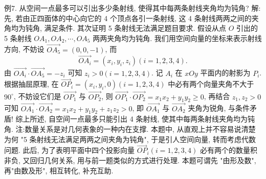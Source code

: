 例7. 从空间一点最多可以引出多少条射线, 使得其中每两条射线夹角均为钝角?
解:先, 若由正四面体的中心向它的 4 个顶点各引一条射线, 这 4 条射线两两之间的夹角均为钝角, 满足条件.
其次证明 5 条射线无法满足题目要求.
假设从点 $O$ 引出的 5 条射线 $O A_1, O A_2, \cdots, O A_5$ 两两夹角均为钝角.
我们用空间向量的坐标来表示射线方向, 不妨设 $\overrightarrow{O A_5}=(0,0,-1)$, 而
$$
\overrightarrow{O A_i}=\left(x_i, y_i, z_i\right)(i=1,2,3,4) .
$$
由 $\overrightarrow{O A_i} \cdot \overrightarrow{O A_5}=-z_i$ 可知 $z_i>0(i=1,2,3,4)$.
记 $A_i$ 在 $x O y$ 平面内的射影为 $P_i$.
根据抽屈原理, 在 $\overrightarrow{O P}_i=\left(x_i, y_i, 0\right)(i=1,2,3,4)$ 中必有两个向量夹角不大于 $90^{\circ}$, 不妨设它们是 $\overrightarrow{O P_1}$ 与 $\overrightarrow{O P_2}$, 则 $\overrightarrow{O P_1} \cdot \overrightarrow{O P_2}=x_1 x_2+y_1 y_2 \geqslant 0$, 再结合 $z_1, z_2>0$ 可知 $\overrightarrow{O A_1} \cdot \overrightarrow{O A_2}=x_1 x_2+y_1 y_2+z_1 z_2>0$, 即 $\overrightarrow{O A_1}$ 与 $\overrightarrow{O A_2}$ 夹角为锐角, 与条件矛盾!
综上所述, 自空间一点最多只能引出 4 条射线, 使其中每两条射线夹角均为钝角.
注:数量关系是对几何表象的一种内在支撑.
本题中, 从直观上并不容易说清楚为何 "5 条射线无法满足两两之间夹角为钝角", 于是引人空间向量, 转而考虑代数问题.
此后, 为了表明平面中四个投影向量 $\overrightarrow{O P}_i(i=1,2,3,4)$ 必有两个的数量积非负, 又回归几何关系, 用与前一题类似的方式进行处理.
本题可谓先 "由形及数", 再"由数及形", 相互转化, 补充互助.



